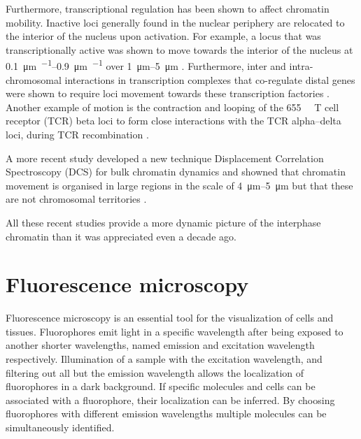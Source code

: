     Furthermore, transcriptional regulation has been shown to affect
    chromatin mobility.  Inactive loci generally found in the nuclear
    periphery are relocated to the interior of the nucleus upon
    activation.  For example, a locus that was transcriptionally active
    was shown to move towards the interior of the nucleus at
    \SIrange{0.1}{0.9}{\micro\meter\per\min} over
    \SIrange{1}{5}{\micro\meter} \citep{chuang2006long}.  Furthermore, inter
    and intra-chromosomal interactions in transcription complexes that
    co-regulate distal genes were shown to require loci movement
    towards these transcription factories \citep{osborne2004active}.
    Another example of motion is the contraction and looping of the
    \SI{655}{\kilo\bp} T cell receptor (TCR) beta loci to form close
    interactions with the TCR alpha--delta loci, during TCR
    recombination \citep{skok2007reversible}.

    A more recent study developed a new technique Displacement
    Correlation Spectroscopy (DCS) for bulk chromatin dynamics and
    showned that chromatin movement is organised in large regions in the
    scale of \SIrange{4}{5}{\micro\meter} but that these are not
    chromosomal territories \citep{zidovska2013micron}.

    All these recent studies provide a more dynamic picture of the
    interphase chromatin than it was appreciated even a decade ago.

\section{Fluorescence microscopy}

  Fluorescence microscopy is an essential tool
  for the visualization of cells and tissues.
  Fluorophores emit light in a specific wavelength after
  being exposed to another shorter wavelengths, named
  emission and excitation wavelength respectively.
  Illumination of a sample with the excitation wavelength, and filtering
  out all but the emission wavelength allows
  the localization of fluorophores in a dark background.
  If specific molecules and cells can be associated with a fluorophore,
  their localization can be inferred.  By choosing fluorophores
  with different emission wavelengths multiple molecules can be
  simultaneously identified.

